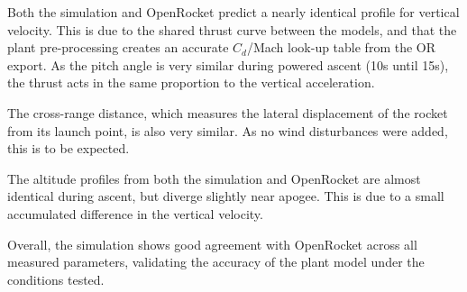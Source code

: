 Both the simulation and OpenRocket predict a nearly identical profile for vertical velocity. 
This is due to the shared thrust curve between the models, and that the plant pre-processing creates an accurate $C_d$/Mach look-up table from the OR export.
As the pitch angle is very similar during powered ascent (10s until 15s), the thrust acts in the same proportion to the vertical acceleration.

The cross-range distance, which measures the lateral displacement of the rocket from its launch point, is also very similar.
As no wind disturbances were added, this is to be expected.
    
The altitude profiles from both the simulation and OpenRocket are almost identical during ascent, but diverge slightly near apogee.
This is due to a small accumulated difference in the vertical velocity.  

Overall, the simulation shows good agreement with OpenRocket across all measured parameters, validating the accuracy of the plant model under the conditions tested.